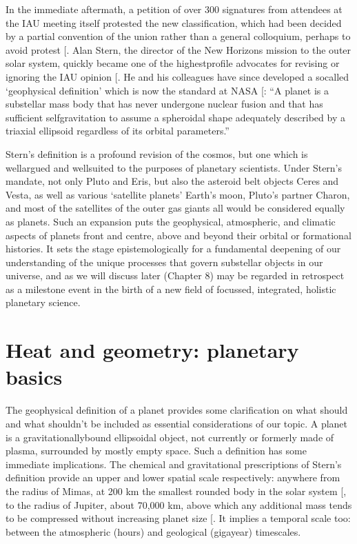 \documentclass[letterpaper,10pt,english]{jupyterBook}
\begin{document}
\sphinxAtStartPar
In the immediate aftermath, a petition of over 300 signatures from attendees at the IAU meeting itself protested the new classification, which had been decided by a partial convention of the union rather than a general colloquium, perhaps to avoid protest {[}\sphinxcite{references:id127}{]}. Alan Stern, the director of the New Horizons mission to the outer solar system, quickly became one of the highest\sphinxhyphen{}profile advocates for revising or ignoring the IAU opinion {[}\sphinxcite{references:id132}{]}. He and his colleagues have since developed a so\sphinxhyphen{}called ‘geophysical definition’ which is now the standard at NASA {[}\sphinxcite{references:id119}{]}: “A planet is a sub\sphinxhyphen{}stellar mass body that has never undergone nuclear fusion and that has sufficient self\sphinxhyphen{}gravitation to assume a spheroidal shape adequately described by a triaxial ellipsoid regardless of its orbital parameters.”

\sphinxAtStartPar
Stern’s definition is a profound revision of the cosmos, but one which is well\sphinxhyphen{}argued and well\sphinxhyphen{}suited to the purposes of planetary scientists. Under Stern’s mandate, not only Pluto and Eris, but also the asteroid belt objects Ceres and Vesta, as well as various ‘satellite planets’ \sphinxhyphen{} Earth’s moon, Pluto’s partner Charon, and most of the satellites of the outer gas giants \sphinxhyphen{} all would be considered equally as planets. Such an expansion puts the geophysical, atmospheric, and climatic aspects of planets front and centre, above and beyond their orbital or formational histories. It sets the stage epistemologically for a fundamental deepening of our understanding of the unique processes that govern sub\sphinxhyphen{}stellar objects in our universe, and \sphinxhyphen{} as we will discuss later (Chapter 8) \sphinxhyphen{} may be regarded in retrospect as a milestone event in the birth of a new field of focussed, integrated, holistic planetary science.


\section{Heat and geometry: planetary basics}
\label{\detokenize{content/chapter_01_background/main:heat-and-geometry-planetary-basics}}
\sphinxAtStartPar
The geophysical definition of a planet provides some clarification on what should and what shouldn’t be included as essential considerations of our topic. A planet is a gravitationally\sphinxhyphen{}bound ellipsoidal object, not currently or formerly made of plasma, surrounded by mostly empty space. Such a definition has some immediate implications. The chemical and gravitational prescriptions of Stern’s definition provide an upper and lower spatial scale respectively: anywhere from the radius of Mimas, at 200 km the smallest rounded body in the solar system {[}\sphinxcite{references:id473}{]}, to the radius of Jupiter, about 70,000 km, above which any additional mass tends to be compressed without increasing planet size {[}\sphinxcite{references:id118}{]}. It implies a temporal scale too: between the atmospheric (hours) and geological (gigayear) timescales.
\end{document}
